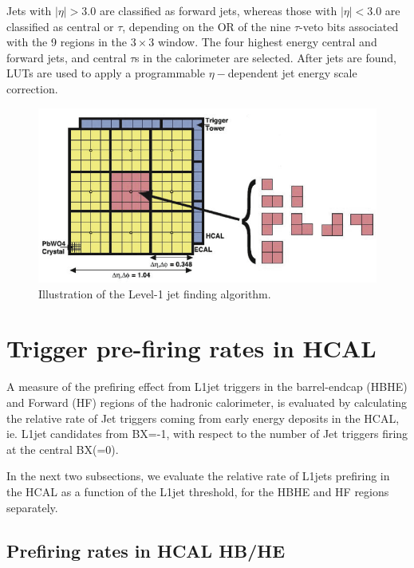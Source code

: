 \documentclass[11pt]{cmspaperpdf}
\begin{document}
Jets with $|\eta|>3.0$ are classified as forward jets, whereas those with $|\eta|<3.0$ are classified as central or $\tau$, 
depending on the OR of the nine $\tau$-veto bits associated with the 9 regions in the $3 \times 3$ window. 
The four highest energy central and forward jets, and central $\tau$s in the calorimeter are selected. 
After jets are found, LUTs are used to apply a programmable $\eta-$dependent jet energy scale correction.

\begin{figure}[h!]
\centering
\includegraphics[scale=1.0]{plots/L1JetAlgorithm.png}
\caption{Illustration of the Level-1 jet finding algorithm.}
\label{fig:l1jetalgo}
\end{figure}
\vspace{5mm}


\section{Trigger pre-firing rates in HCAL}

A measure of the prefiring effect from L1jet triggers in the barrel-endcap (HBHE) and Forward (HF) regions of the hadronic calorimeter, is evaluated by calculating the relative rate of Jet triggers coming from early energy deposits in the HCAL, ie. L1jet candidates from BX=-1, with respect to the number of Jet triggers firing at the central BX(=0).

In the next two subsections, we evaluate the relative rate of L1jets prefiring in the HCAL as a function of the L1jet threshold, for the HBHE and HF regions separately.

\subsection{Prefiring rates in HCAL HB/HE}
\label{sec:rates_hbhe}
\end{document}
